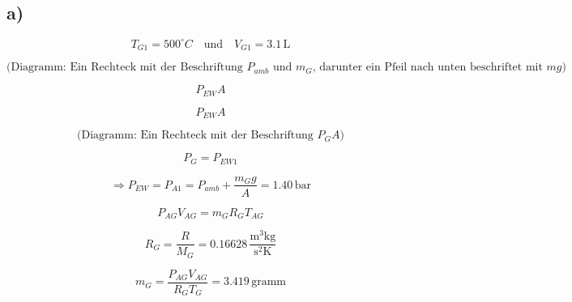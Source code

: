 

\subsection*{a)}

\[
T_{G1} = 500^\circ C \quad \text{und} \quad V_{G1} = 3.1 \, \text{L}
\]

\[
\text{(Diagramm: Ein Rechteck mit der Beschriftung } P_{amb} \text{ und } m_G \text{, darunter ein Pfeil nach unten beschriftet mit } mg \text{)}
\]

\[
P_{EW} A
\]

\[
P_{EW} A
\]

\[
\text{(Diagramm: Ein Rechteck mit der Beschriftung } P_G A \text{)}
\]

\[
P_G = P_{EW1}
\]

\[
\Rightarrow P_{EW} = P_{A1} = P_{amb} + \frac{m_G g}{A} = 1.40 \, \text{bar}
\]

\[
P_{AG} V_{AG} = m_G R_G T_{AG}
\]

\[
R_G = \frac{R}{M_G} = 0.16628 \, \frac{\text{m}^3 \text{kg}}{\text{s}^2 \text{K}}
\]

\[
m_G = \frac{P_{AG} V_{AG}}{R_G T_{G}} = 3.419 \, \text{gramm}
\]